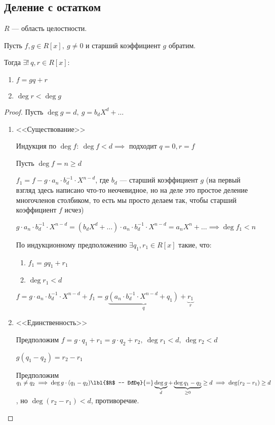 \subsection{Деление с остатком}

\begin{theorem}

    $R$ --- область целостности.
    
    Пусть $f, g \in R[x],~g \neq 0$ и старший коэффициент $g$ обратим.

    Тогда $\exists!~q, r \in R[x]$:

    \begin{enumerate}
        \item $f = gq + r$
    
        \item $\deg r < \deg g$
    \end{enumerate}
\end{theorem}

\begin{proof}
    Пусть $\deg g = d,~g = b_dX^d + \ldots$

    \begin{enumerate}
        \item <<Существование>>
        
        Индукция по $\deg f:\ \deg f < d \implies$ подходит $q = 0, r = f$

        Пусть $\deg f = n \geq d$

        $f_1 = f - g \cdot a_n \cdot b_d^{-1} \cdot X^{n-d}$, где $b_d$ --- старший коэффициент $g$ (на первый взгляд здесь написано что-то неочевидное, но на деле это простое деление многочленов столбиком, то есть мы просто делаем так, чтобы старший коэффициент $f$ исчез)

        $g \cdot a_n \cdot b_d^{-1} \cdot X^{n-d} = (b_d X^d + \ldots) \cdot a_n \cdot b_d^{-1} \cdot X^{n-d} = a_nX^n + \ldots \implies \deg f_1 < n$

        По индукционному предположению $\exists q_1, r_1 \in R[x]$ такие, что:
        \begin{enumerate}
            \item $f_1 = gq_1 + r_1$
            \item $\deg r_1 < d$
        \end{enumerate}

        $f = g \cdot a_n \cdot b_d^{-1} \cdot X^{n - d} + f_1 = g \underbrace{(a_n \cdot b_d^{-1} \cdot X^{n - d} + q_1)}_{q} + \underbrace{r_1}_{r}$


        \item <<Единственность>>
        
        Предположим $f = g \cdot q_1 + r_1 = g \cdot q_2 + r_2,~\deg r_1 < d,~ \deg r_2 < d$ 
        
        $g(q_1 - q_2) = r_2 - r_1$

        Предположим $q_1 \neq q_2 \implies \deg g \cdot (q_1 - q_2) \lbl{$R$ --- ОЦ}{=} \underbrace{\deg g}_{d} + \underbrace{\deg{q_1 - q_2}}_{\geq 0} \geq d \implies \deg(r_2 - r_1) \geq d$, но $\deg(r_2 - r_1) < d$, противоречие.
    \end{enumerate}
\end{proof}

